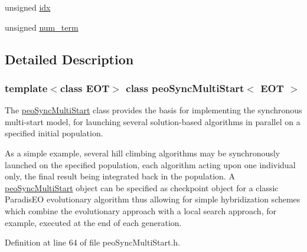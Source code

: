 \begin{CompactItemize}
\item 
\hypertarget{classpeoSyncMultiStart_64191ef79b7b589964ac9c3e23ae6718}{
unsigned \hyperlink{classpeoSyncMultiStart_64191ef79b7b589964ac9c3e23ae6718}{idx}}
\label{classpeoSyncMultiStart_64191ef79b7b589964ac9c3e23ae6718}

\item 
\hypertarget{classpeoSyncMultiStart_773eb9097550d9444f25ca8f48997a30}{
unsigned \hyperlink{classpeoSyncMultiStart_773eb9097550d9444f25ca8f48997a30}{num\_\-term}}
\label{classpeoSyncMultiStart_773eb9097550d9444f25ca8f48997a30}

\end{CompactItemize}


\subsection{Detailed Description}
\subsubsection*{template$<$class EOT$>$ class peo\-Sync\-Multi\-Start$<$ EOT $>$}

The \hyperlink{classpeoSyncMultiStart}{peo\-Sync\-Multi\-Start} class provides the basis for implementing the synchronous multi-start model, for launching several solution-based algorithms in parallel on a specified initial population. 

As a simple example, several hill climbing algorithms may be synchronously launched on the specified population, each algorithm acting upon one individual only, the final result being integrated back in the population. A \hyperlink{classpeoSyncMultiStart}{peo\-Sync\-Multi\-Start} object can be specified as checkpoint object for a classic Paradis\-EO evolutionary algorithm thus allowing for simple hybridization schemes which combine the evolutionary approach with a local search approach, for example, executed at the end of each generation. 



Definition at line 64 of file peo\-Sync\-Multi\-Start.h.

